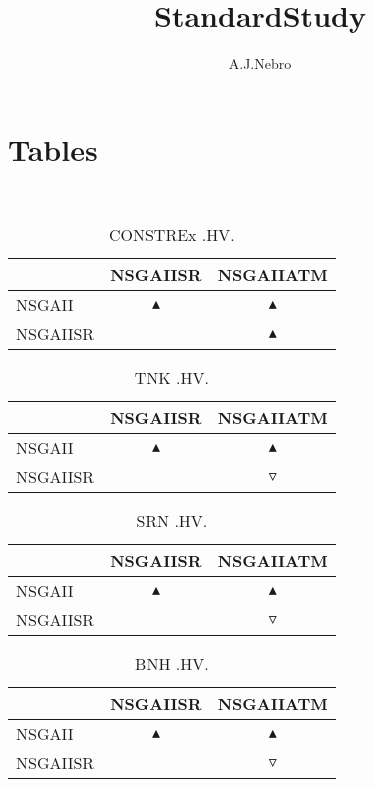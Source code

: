 \documentclass{article}
\title{StandardStudy}
\author{A.J.Nebro}
\begin{document}
\maketitle
\section{Tables}
\
\begin{table}
\caption{
CONSTREx
.HV.}
\label{Table:
CONSTREx
.HV.}
\centering
\begin{scriptsize}
\begin{tabular}{
lcc
}
\hline  & NSGAIISR & NSGAIIATM\\ 
\hline 
NSGAII
 & 
$\blacktriangle$
 & 
$\blacktriangle$
 \\ 
NSGAIISR
 & 
  
 & 
$\blacktriangle$
 \\ 
\hline
\end{tabular}
\end{scriptsize}
\end{table}
\begin{table}
\caption{
TNK
.HV.}
\label{Table:
TNK
.HV.}
\centering
\begin{scriptsize}
\begin{tabular}{
lcc
}
\hline  & NSGAIISR & NSGAIIATM\\ 
\hline 
NSGAII
 & 
$\blacktriangle$
 & 
$\blacktriangle$
 \\ 
NSGAIISR
 & 
  
 & 
$\triangledown$
 \\ 
\hline
\end{tabular}
\end{scriptsize}
\end{table}
\begin{table}
\caption{
SRN
.HV.}
\label{Table:
SRN
.HV.}
\centering
\begin{scriptsize}
\begin{tabular}{
lcc
}
\hline  & NSGAIISR & NSGAIIATM\\ 
\hline 
NSGAII
 & 
$\blacktriangle$
 & 
$\blacktriangle$
 \\ 
NSGAIISR
 & 
  
 & 
$\triangledown$
 \\ 
\hline
\end{tabular}
\end{scriptsize}
\end{table}
\begin{table}
\caption{
BNH
.HV.}
\label{Table:
BNH
.HV.}
\centering
\begin{scriptsize}
\begin{tabular}{
lcc
}
\hline  & NSGAIISR & NSGAIIATM\\ 
\hline 
NSGAII
 & 
$\blacktriangle$
 & 
$\blacktriangle$
 \\ 
NSGAIISR
 & 
  
 & 
$\triangledown$
 \\ 
\hline
\end{tabular}
\end{scriptsize}
\end{table}
\end{document}
